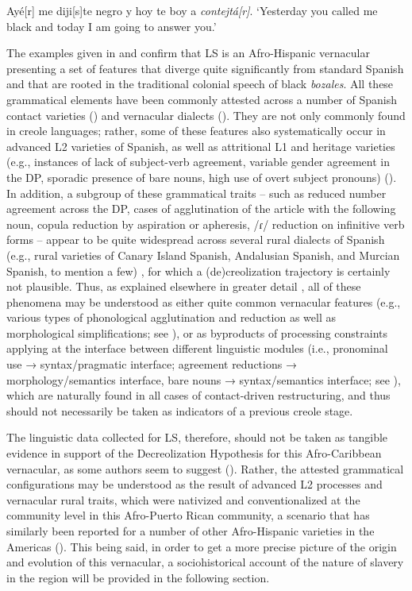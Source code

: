 \documentclass[output=paper,colorlinks,citecolor=brown]{langscibook}
\begin{document}
\ex \label{ex:visconte:2i}
{Ayé[r] me diji[s]te negro y hoy te boy a} \textit{{contejtá[r]}}.
\glt `Yesterday you called me black and today I am going to            answer you.’ \citep[77]{Vizcarrondo1983}
\z
\z

The examples given in  and  confirm that LS is an Afro-Hispanic vernacular presenting a set of features that diverge quite significantly from standard Spanish and that are rooted in the traditional colonial speech of black \textit{bozales}. All these grammatical elements have been commonly attested across a number of Spanish contact varieties (\citealt{Klee_lynch2009}) and vernacular dialects (\citealt{Zamora-Vicente1989,lipski1994latin}). They are not only commonly found in creole languages; rather, some of these features also systematically occur in advanced L2 varieties of Spanish, as well as attritional L1 and heritage varieties (e.g., instances of lack of subject-verb agreement, variable gender agreement in the DP, sporadic presence of bare nouns, high use of overt subject pronouns) (\citealt{Montrul2008,Montrul2016,Geeslin2013,Romerosessarego2018}). In addition, a subgroup of these grammatical traits -- such as reduced number agreement across the DP, cases of agglutination of the article with the following noun, copula reduction by aspiration or apheresis, /ɾ/ reduction on infinitive verb forms -- appear to be quite widespread across several rural dialects of Spanish (e.g., rural varieties of Canary Island Spanish, Andalusian Spanish, and Murcian Spanish, to mention a few) \citep{Alvar1996}, for which a (de)creolization trajectory is certainly not plausible. Thus, as explained elsewhere in greater detail \citep{Sessarego2019}, all of these phenomena may be understood as either quite common vernacular features (e.g., various types of phonological agglutination and reduction as well as morphological simplifications; see \citealt{Sessarego2011}), or as byproducts of processing constraints applying at the interface between different linguistic modules (i.e., pronominal use → syntax/pragmatic interface; agreement reductions → morphology/semantics interface, bare nouns → syntax/semantics interface; see \citealt{Sessarego2021}), which are naturally found in all cases of contact-driven restructuring, and thus should not necessarily be taken as indicators of a previous creole stage.

The linguistic data collected for LS, therefore, should not be taken as tangible evidence in support of the Decreolization Hypothesis for this Afro-Caribbean vernacular, as some authors seem to suggest (\citealt{Grandade1970,Otheguy1973,Guy2017}). Rather, the attested grammatical configurations may be understood as the result of advanced L2 processes and vernacular rural traits, which were nativized and conventionalized at the community level in this Afro-Puerto Rican community, a scenario that has similarly been reported for a number of other Afro-Hispanic varieties in the Americas (\citealt{Lipski2005,Sessarego2013_iberia}). This being said, in order to get a more precise picture of the origin and evolution of this vernacular, a sociohistorical account of the nature of slavery in the region will be provided in the following section.
\end{document}
